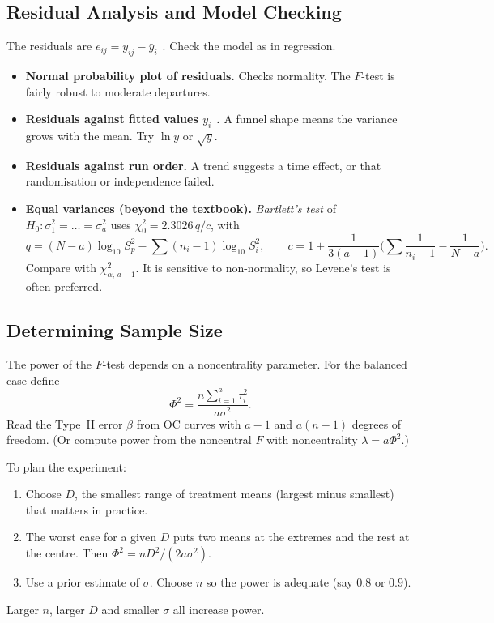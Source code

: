 \subsection{Residual Analysis and Model Checking}

The residuals are $e_{ij}=y_{ij}-\bar{y}_{i\cdot}$. Check the model as in regression.
\begin{itemize}
  \item \textbf{Normal probability plot of residuals.} Checks normality. The $F$-test is fairly robust to moderate departures.
  \item \textbf{Residuals against fitted values $\bar{y}_{i\cdot}$.} A funnel shape means the variance grows with the mean. Try $\ln y$ or $\sqrt y$.
  \item \textbf{Residuals against run order.} A trend suggests a time effect, or that randomisation or independence failed.
  \item \textbf{Equal variances (beyond the textbook).} \emph{Bartlett's test} of $H_0:\sigma_1^2=\dots=\sigma_a^2$ uses $\chi_0^2=2.3026\,q/c$, with
  \[ q=(N-a)\log_{10}S_p^2-\sum(n_i-1)\log_{10}S_i^2,\qquad c=1+\frac1{3(a-1)}\Big(\sum\frac1{n_i-1}-\frac1{N-a}\Big). \]
  Compare with $\chi^2_{\alpha,\,a-1}$. It is sensitive to non-normality, so Levene's test is often preferred.
\end{itemize}

\subsection{Determining Sample Size}

The power of the $F$-test depends on a noncentrality parameter. For the balanced case define
\[ \Phi^2=\frac{n\sum_{i=1}^a\tau_i^2}{a\sigma^2}. \]
Read the Type~II error $\beta$ from OC curves with $a-1$ and $a(n-1)$ degrees of freedom. (Or compute power from the noncentral $F$ with noncentrality $\lambda=a\Phi^2$.)

To plan the experiment:
\begin{enumerate}
  \item Choose $D$, the smallest range of treatment means (largest minus smallest) that matters in practice.
  \item The worst case for a given $D$ puts two means at the extremes and the rest at the centre. Then $\Phi^2=nD^2/(2a\sigma^2)$.
  \item Use a prior estimate of $\sigma$. Choose $n$ so the power is adequate (say $0.8$ or $0.9$).
\end{enumerate}
Larger $n$, larger $D$ and smaller $\sigma$ all increase power.

